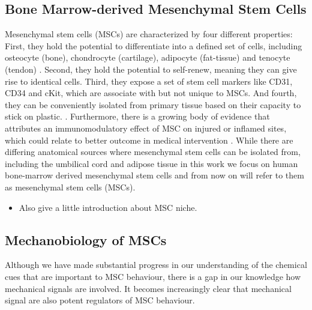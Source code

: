 \subsection{Bone Marrow-derived Mesenchymal Stem Cells}

Mesenchymal stem cells (MSCs) are characterized by four different properties: First, they hold the potential to differentiate into a defined set of cells, including osteocyte (bone), chondrocyte (cartilage), adipocyte (fat-tissue) and tenocyte (tendon) \cite{Ng2008}. Second, they hold the potential to self-renew, meaning they can give rise to identical cells. Third, they expose a set of stem cell markers like CD31, CD34 and cKit, which are associate with but not unique to MSCs. \cite{Battula2009} And fourth, they can be conveniently isolated from primary tissue based on their capacity to stick on plastic. \cite{Buhring2007}. Furthermore, there is a growing body of evidence that attributes an immunomodulatory effect of MSC on injured or inflamed sites, which could relate to better outcome in medical intervention \cite{Caplan2011, Hass2011}.
While there are differing anatomical sources where mesenchymal stem cells can be isolated from, including the umbilical cord and adipose tissue \cite{Barlow2008, Hass2011} in this work we focus on human bone-marrow derived mesenchymal stem cells and from now on will refer to them as mesenchymal stem cells (MSCs).

\begin{itemize}
	\item Also give a little introduction about MSC niche. 
\end{itemize}

\subsection{Mechanobiology of MSCs}

Although we have made substantial progress in our understanding of the chemical cues that are important to MSC behaviour, there is a gap in our knowledge how mechanical signals are involved. It becomes increasingly clear that mechanical signal are also potent regulators of MSC behaviour. 



